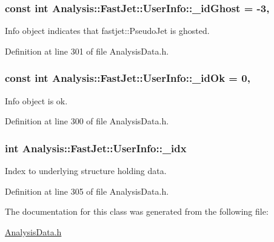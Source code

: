 \subsubsection[{\texorpdfstring{\+\_\+id\+Ghost}{_idGhost}}]{\setlength{\rightskip}{0pt plus 5cm}const int Analysis\+::\+Fast\+Jet\+::\+User\+Info\+::\+\_\+id\+Ghost = -\/3\hspace{0.3cm}{\ttfamily [static]}, {\ttfamily [private]}}\hypertarget{classAnalysis_1_1FastJet_1_1UserInfo_ae7eefe2914d52bb4fa38566bdb300607}{}\label{classAnalysis_1_1FastJet_1_1UserInfo_ae7eefe2914d52bb4fa38566bdb300607}


Info object indicates that {\ttfamily fastjet\+::\+Pseudo\+Jet} is ghosted. 



Definition at line 301 of file Analysis\+Data.\+h.

\subsubsection[{\texorpdfstring{\+\_\+id\+Ok}{_idOk}}]{\setlength{\rightskip}{0pt plus 5cm}const int Analysis\+::\+Fast\+Jet\+::\+User\+Info\+::\+\_\+id\+Ok = 0\hspace{0.3cm}{\ttfamily [static]}, {\ttfamily [private]}}\hypertarget{classAnalysis_1_1FastJet_1_1UserInfo_a85f8fb3a938f3a5ccffcbab501c8acbc}{}\label{classAnalysis_1_1FastJet_1_1UserInfo_a85f8fb3a938f3a5ccffcbab501c8acbc}


Info object is ok. 



Definition at line 300 of file Analysis\+Data.\+h.

\subsubsection[{\texorpdfstring{\+\_\+idx}{_idx}}]{\setlength{\rightskip}{0pt plus 5cm}int Analysis\+::\+Fast\+Jet\+::\+User\+Info\+::\+\_\+idx\hspace{0.3cm}{\ttfamily [protected]}}\hypertarget{classAnalysis_1_1FastJet_1_1UserInfo_ad9aa33e317aea2b675493b664cc718a3}{}\label{classAnalysis_1_1FastJet_1_1UserInfo_ad9aa33e317aea2b675493b664cc718a3}


Index to underlying structure holding data. 



Definition at line 305 of file Analysis\+Data.\+h.



The documentation for this class was generated from the following file\+:\begin{DoxyCompactItemize}
\item 
\hyperlink{AnalysisData_8h}{Analysis\+Data.\+h}\end{DoxyCompactItemize}
